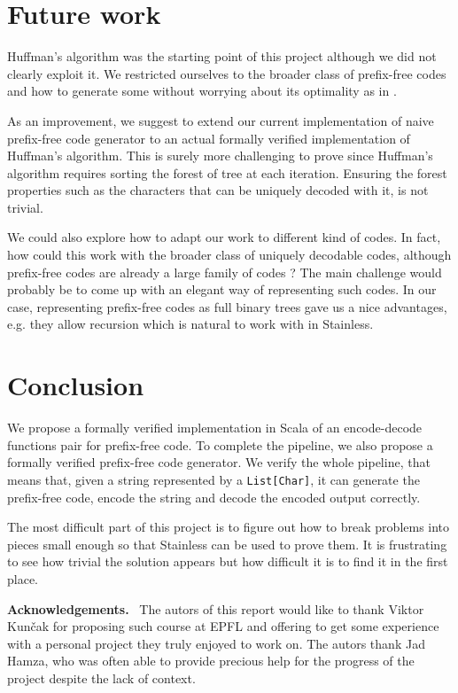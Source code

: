 \documentclass[a4paper,UKenglish,cleveref, autoref, thm-restate]{lipics-v2021}
\begin{document}
\section{Future work}

Huffman's algorithm was the starting point of this project although we did not clearly exploit it. We restricted ourselves to the broader class of prefix-free codes and how to generate some without worrying about its optimality as in \cite{blanchette}. 

As an improvement, we suggest to extend our current implementation of naive prefix-free code generator to an actual formally verified implementation of Huffman's algorithm. This is surely more challenging to prove since Huffman's algorithm requires sorting the forest of tree at each iteration. Ensuring the forest properties such as the characters that can be uniquely decoded with it, is not trivial.

We could also explore how to adapt our work to different kind of codes. In fact, how could this work with the broader class of uniquely decodable codes, although prefix-free codes are already a large family of codes ? The main challenge would probably be to come up with an elegant way of representing such codes. In our case, representing prefix-free codes as full binary trees gave us a nice advantages, e.g. they allow recursion which is natural to work with in Stainless.

\section{Conclusion}
We propose a formally verified implementation in Scala of an encode-decode functions pair for prefix-free code. To complete the pipeline, we also propose a formally verified prefix-free code generator.
We verify the whole pipeline, that means that, given a string represented by a \lstinline{List[Char]}, it can generate the prefix-free code, encode the string and decode the encoded output correctly.

The most difficult part of this project is to figure out how to break problems into pieces small enough so that Stainless can be used to prove them. 
It is frustrating to see how trivial the solution appears but how difficult it is to find it in the first place.

\vspace{0.5cm} %
\noindent %
\textbf{\large Acknowledgements.}\ %
The autors of this report would like to thank Viktor Kun\v{c}ak for proposing such course at EPFL and offering to get some experience with a personal project they truly enjoyed to work on. The autors thank Jad Hamza, who was often able to provide precious help for the progress of the project despite the lack of context.


\end{document}
